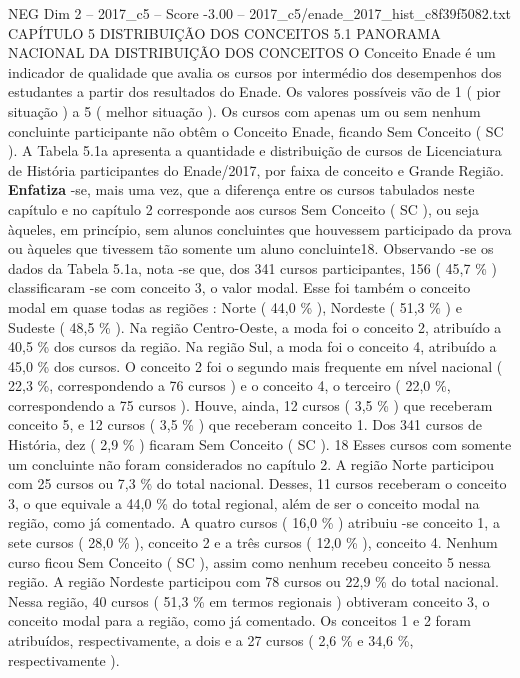\begin{textsample}{NEG Dim 2 – 2017\_c5 – Score -3.00 – 2017\_c5/enade\_2017\_hist\_c8f39f5082.txt}  \label{ex:f2_neg_045}
CAPÍTULO 5 DISTRIBUIÇÃO DOS CONCEITOS 5.1 PANORAMA NACIONAL DA DISTRIBUIÇÃO DOS CONCEITOS O Conceito Enade é um indicador de qualidade que avalia os cursos por intermédio dos desempenhos dos estudantes a partir dos resultados do Enade.
Os valores possíveis vão de 1 ( pior situação ) a 5 ( melhor situação ).
Os cursos com apenas um ou sem nenhum concluinte participante não obtêm o Conceito Enade, ficando Sem Conceito ( SC ).
A Tabela 5.1a apresenta a quantidade e distribuição de cursos de Licenciatura de História participantes do Enade/2017, por faixa de conceito e Grande Região. \textbf{Enfatiza} -se, mais uma vez, que a diferença entre os cursos tabulados neste capítulo e no capítulo 2 corresponde aos cursos Sem Conceito ( SC ), ou seja àqueles, em princípio, sem alunos concluintes que houvessem participado da prova ou àqueles que tivessem tão somente um aluno concluinte18.
Observando -se os dados da Tabela 5.1a, nota -se que, dos 341 cursos participantes, 156 ( 45,7 \% ) classificaram -se com conceito 3, o valor modal.
Esse foi também o conceito modal em quase todas as regiões : Norte ( 44,0 \% ), Nordeste ( 51,3 \% ) e Sudeste ( 48,5 \% ).
Na região Centro-Oeste, a moda foi o conceito 2, atribuído a 40,5 \% dos cursos da região.
Na região Sul, a moda foi o conceito 4, atribuído a 45,0 \% dos cursos.
O conceito 2 foi o segundo mais frequente em nível nacional ( 22,3 \%, correspondendo a 76 cursos ) e o conceito 4, o terceiro ( 22,0 \%, correspondendo a 75 cursos ).
Houve, ainda, 12 cursos ( 3,5 \% ) que receberam conceito 5, e 12 cursos ( 3,5 \% ) que receberam conceito 1.
Dos 341 cursos de História, dez ( 2,9 \% ) ficaram Sem Conceito ( SC ). 18 Esses cursos com somente um concluinte não foram considerados no capítulo 2.
A região Norte participou com 25 cursos ou 7,3 \% do total nacional.
Desses, 11 cursos receberam o conceito 3, o que equivale a 44,0 \% do total regional, além de ser o conceito modal na região, como já comentado.
A quatro cursos ( 16,0 \% ) atribuiu -se conceito 1, a sete cursos ( 28,0 \% ), conceito 2 e a três cursos ( 12,0 \% ), conceito 4.
Nenhum curso ficou Sem Conceito ( SC ), assim como nenhum recebeu conceito 5 nessa região.
A região Nordeste participou com 78 cursos ou 22,9 \% do total nacional.
Nessa região, 40 cursos ( 51,3 \% em termos regionais ) obtiveram conceito 3, o conceito modal para a região, como já comentado.
Os conceitos 1 e 2 foram atribuídos, respectivamente, a dois e a 27 cursos ( 2,6 \% e 34,6 \%, respectivamente ).

\end{textsample}
